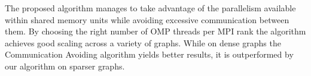The proposed algorithm manages to take advantage of the parallelism available within shared memory units while avoiding excessive communication between them. By choosing the right number of OMP threads per MPI rank the algorithm achieves good scaling across a variety of graphs. While on dense graphs the Communication Avoiding algorithm \cite{comm_avoiding} yields better results, it is outperformed by our algorithm on sparser graphs. 